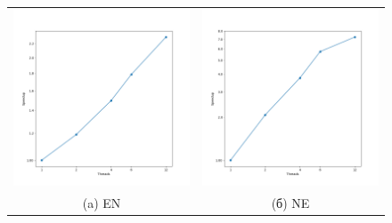 \documentclass[12pt, a4paper]{article}
\begin{document}
\begin{figure}[H]
	\center
	\begin{tabular}{cc}
		\includegraphics[width=85mm]{2025/boost_construct} & \includegraphics[width=85mm]{2025/boost_transpose} \\
		(a) EN & (б) NE \\

\end{tabular}
\end{figure}
\end{document}
